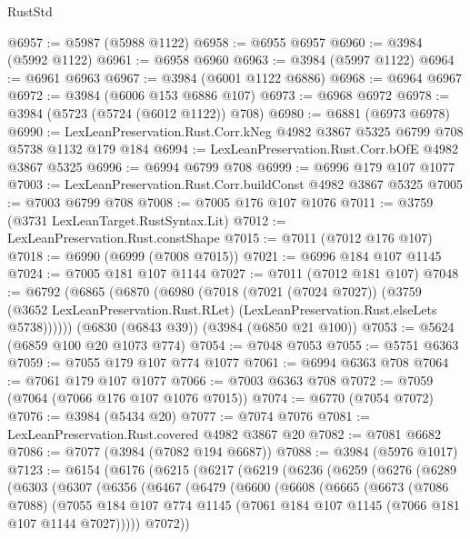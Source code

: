 \begin{lexlean}{RustStd}
\begin{coremodule}
@6957 := @5987 (@5988 @1122)
@6958 := @6955 @6957
@6960 := @3984 (@5992 @1122)
@6961 := @6958 @6960
@6963 := @3984 (@5997 @1122)
@6964 := @6961 @6963
@6967 := @3984 (@6001 @1122 @6886)
@6968 := @6964 @6967
@6972 := @3984 (@6006 @153 @6886 @107)
@6973 := @6968 @6972
@6978 := @3984 (@5723 (@5724 (@6012 @1122)) @708)
@6980 := @6881 (@6973 @6978)
@6990 := LexLeanPreservation.Rust.Corr.kNeg @4982 @3867 @5325 @6799 @708 @5738 @1132 @179 @184
@6994 := LexLeanPreservation.Rust.Corr.bOfE @4982 @3867 @5325
@6996 := @6994 @6799 @708
@6999 := @6996 @179 @107 @1077
@7003 := LexLeanPreservation.Rust.Corr.buildConst @4982 @3867 @5325
@7005 := @7003 @6799 @708
@7008 := @7005 @176 @107 @1076
@7011 := @3759 (@3731 LexLeanTarget.RustSyntax.Lit)
@7012 := LexLeanPreservation.Rust.constShape
@7015 := @7011 (@7012 @176 @107)
@7018 := @6990 (@6999 (@7008 @7015))
@7021 := @6996 @184 @107 @1145
@7024 := @7005 @181 @107 @1144
@7027 := @7011 (@7012 @181 @107)
@7048 := @6792
    (@6865
      (@6870
        (@6980
          (@7018
            (@7021 (@7024 @7027))
            (@3759
              (@3652 LexLeanPreservation.Rust.RLet)
              (LexLeanPreservation.Rust.elseLets @5738))))))
    (@6830 (@6843 @39))
    (@3984 (@6850 @21 @100))
@7053 := @5624 (@6859 @100 @20 @1073 @774)
@7054 := @7048 @7053
@7055 := @5751 @6363
@7059 := @7055 @179 @107 @774 @1077
@7061 := @6994 @6363 @708
@7064 := @7061 @179 @107 @1077
@7066 := @7003 @6363 @708
@7072 := @7059 (@7064 (@7066 @176 @107 @1076 @7015))
@7074 := @6770 (@7054 @7072)
@7076 := @3984 (@5434 @20)
@7077 := @7074 @7076
@7081 := LexLeanPreservation.Rust.covered @4982 @3867 @20
@7082 := @7081 @6682
@7086 := @7077 (@3984 (@7082 @194 @6687))
@7088 := @3984 (@5976 @1017)
@7123 := @6154
    (@6176
      (@6215
        (@6217
          (@6219
            (@6236
              (@6259
                (@6276
                  (@6289
                    (@6303
                      (@6307
                        (@6356
                          (@6467
                            (@6479
                              (@6600
                                (@6608
                                  (@6665
                                    (@6673
                                      (@7086 @7088)
                                      (@7055
                                        @184
                                        @107
                                        @774
                                        @1145
                                        (@7061 @184 @107 @1145 (@7066 @181 @107 @1144 @7027)))))
                                  @7072))

\end{coremodule}
\end{lexlean}
